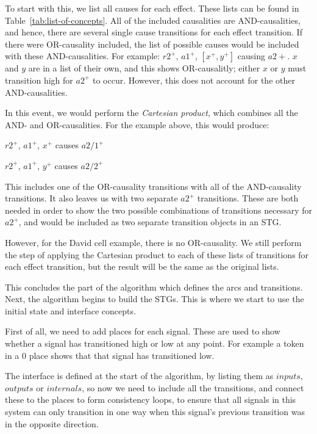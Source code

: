 \documentclass[british,conference,compsoc]{IEEEtran}
\begin{document}
To start with this, we list all causes for each effect. These lists can be found in
Table~\ref{tab:list-of-concepts}.
All of the included causalities are AND-causalities, and hence, there
are several single cause transitions for each effect transition. If there were 
OR-causality included, the list of possible causes would be included with these
AND-causalities. For example:  $r2^{+}$, $a1^{+}$, $[x^{+}, y^{+}]$ causing
$a2{+}$. $x$ and $y$ are in a list of their own, and this shows OR-causalitly;
either $x$ or $y$ must transition high for $a2^{+}$ to occur. However, this does
not account for the other AND-causalities. 

In this event, we would perform the \emph{Cartesian product}, which combines
all the AND- and OR-causalities. For the example above, this would produce:

$r2^{+}$, $a1^{+}$, $x^{+}$ causes $a2/1^{+}$

$r2^{+}$, $a1^{+}$, $y^{+}$ causes $a2/2^{+}$

\noindent This includes one of the OR-causality transitions with all of the 
AND-causality transitions. It also leaves us with two separate $a2^{+}$ 
transitions. These are both needed in order to show the two possible 
combinations of transitions necessary for $a2^{+}$, and would be included as two
separate transition objects in an STG. 

However, for the David cell example, there is no OR-causality. We still perform
the step of applying the Cartesian product to each of these lists of transitions
for each effect transition, but the result will be the same as the original lists.

This concludes the part of the algorithm which defines the arcs
and transitions. Next, the algorithm begins to build the STGs. This is where
we start to use the initial state and interface concepts. 

First of all, we need to add places for each signal. These are used to
show whether a signal has transitioned high or low at any point. 
For example a token in a $0$ place shows that that signal has 
transitioned low. 

The interface is defined at the start of the algorithm, by listing them as 
$inputs$, $outputs$ or $internals$, so now we need to include all the 
transitions, and connect these to the places to form consistency loops, to 
ensure that all signals in this system can only transition in one way when this 
signal's previous transition was in the opposite direction. 
\end{document}
